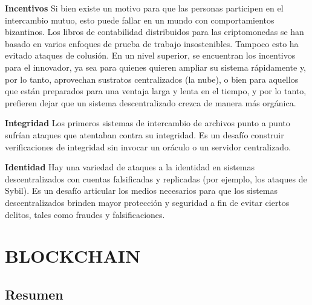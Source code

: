 \documentclass[12pt]{report} %
\begin{document}
\begin{itemize}
\textbf{Incentivos} Si bien existe un motivo para que las personas participen en el intercambio mutuo, esto puede fallar en un mundo con comportamientos bizantinos. Los libros de contabilidad distribuidos para las criptomonedas se han basado en varios enfoques de prueba de trabajo insostenibles. Tampoco esto ha evitado ataques de colusión. En un nivel superior, se encuentran los incentivos para el innovador, ya sea para quienes quieren ampliar su sistema rápidamente y, por lo tanto, aprovechan sustratos centralizados (la nube), o bien para aquellos que están preparados para una ventaja larga y lenta en el tiempo, y por lo tanto, prefieren dejar que un sistema descentralizado crezca de manera más orgánica.  

\textbf{Integridad} Los primeros sistemas de intercambio de archivos punto a punto sufrían ataques que atentaban contra su integridad. Es un desafío construir verificaciones de integridad sin invocar un oráculo o un servidor centralizado. 

\textbf{Identidad} Hay una variedad de ataques a la identidad en sistemas descentralizados con cuentas falsificadas y replicadas (por ejemplo, los ataques de Sybil).  Es un desafío articular los medios necesarios para que los sistemas descentralizados brinden mayor protección y seguridad  a fin de evitar  ciertos delitos, tales como fraudes y falsificaciones.

\section{BLOCKCHAIN}
\label{Blockchain}

\subsection{Resumen}





\end{itemize}
\end{document}
